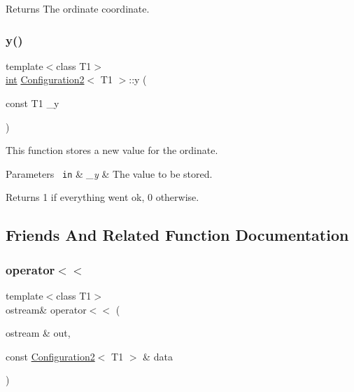 \begin{DoxyReturn}{Returns}
The ordinate coordinate. 
\end{DoxyReturn}
\mbox{\label{class_configuration2_a6cc23545dd1c7d17aa32c96126f1f727}} 
\subsubsection{\texorpdfstring{y()}{y()}\hspace{0.1cm}{\footnotesize\ttfamily [2/2]}}
{\footnotesize\ttfamily template$<$class T1$>$ \\
\mbox{\hyperlink{draw_8hh_aa620a13339ac3a1177c86edc549fda9b}{int}} \mbox{\hyperlink{class_configuration2}{Configuration2}}$<$ T1 $>$\+::y (\begin{DoxyParamCaption}\item[{const T1}]{\+\_\+y }\end{DoxyParamCaption})\hspace{0.3cm}{\ttfamily [inline]}}



This function stores a new value for the ordinate. 


\begin{DoxyParams}[1]{Parameters}
\mbox{\texttt{ in}}  & {\em \+\_\+y} & The value to be stored. \\
\hline
\end{DoxyParams}
\begin{DoxyReturn}{Returns}
1 if everything went ok, 0 otherwise. 
\end{DoxyReturn}


\subsection{Friends And Related Function Documentation}
\mbox{\label{class_configuration2_a90aec83947c9087504b4a9b6f0db8205}} 
\subsubsection{\texorpdfstring{operator$<$$<$}{operator<<}}
{\footnotesize\ttfamily template$<$class T1$>$ \\
ostream\& operator$<$$<$ (\begin{DoxyParamCaption}\item[{ostream \&}]{out,  }\item[{const \mbox{\hyperlink{class_configuration2}{Configuration2}}$<$ T1 $>$ \&}]{data }\end{DoxyParamCaption})\hspace{0.3cm}{\ttfamily [friend]}}



